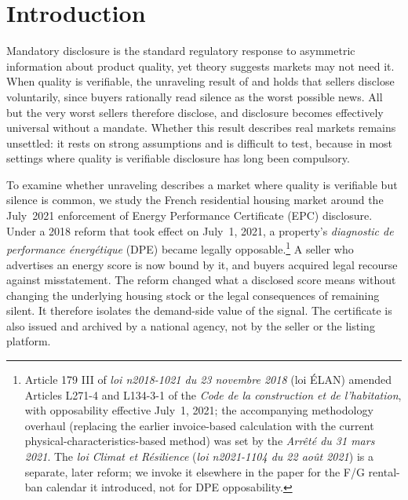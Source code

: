 
\section{Introduction}
\label{sec:intro}

Mandatory disclosure is the standard regulatory response to asymmetric information about
product quality, yet theory suggests markets may not need it. When quality is verifiable, the
unraveling result of \citet{grossman_informational_1981} and \citet{milgrom_good_1981} holds that sellers disclose
voluntarily, since buyers rationally read silence as the worst possible news. All but the very
worst sellers therefore disclose, and disclosure becomes effectively universal without a
mandate. Whether this result describes real markets remains unsettled: it rests on strong
assumptions and is difficult to test, because in most settings where quality is verifiable
disclosure has long been compulsory.

To examine whether unraveling describes a market where quality is verifiable but silence is
common, we study the French residential housing market around the July~2021 enforcement of
Energy Performance Certificate (EPC) disclosure. Under a 2018 reform that took effect on
July~1, 2021, a property's \emph{diagnostic de performance \'energ\'etique} (DPE) became
legally opposable.\footnote{Article 179 III of \emph{loi n\textdegree{}2018-1021 du 23 novembre
2018} (loi \'ELAN) amended Articles L271-4 and L134-3-1 of the \emph{Code de la construction et
de l'habitation}, with opposability effective July~1, 2021; the accompanying methodology
overhaul (replacing the earlier invoice-based calculation with the current
physical-characteristics-based method) was set by the \emph{Arr\^et\'e du 31 mars 2021}. The
\emph{loi Climat et R\'esilience} (\emph{loi n\textdegree{}2021-1104 du 22 ao\^ut 2021}) is a
separate, later reform; we invoke it elsewhere in the paper for the F/G rental-ban calendar it
introduced, not for DPE opposability.} A seller who advertises an energy score is now bound by
it, and buyers acquired legal recourse against misstatement. The reform changed what a disclosed
score means without changing the underlying housing stock or the legal consequences of remaining
silent. It therefore isolates the demand-side value of the signal. The certificate is also issued
and archived by a national agency, not by the seller or the listing platform.

